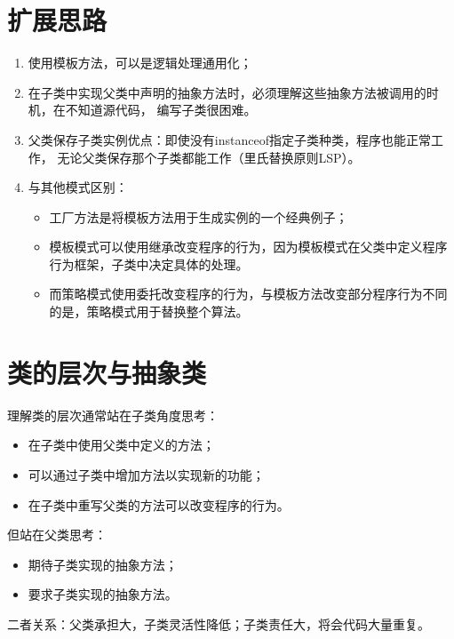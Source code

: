 \section{扩展思路}
\begin{enumerate}
	\item 使用模板方法，可以是逻辑处理通用化；
	\item 在子类中实现父类中声明的抽象方法时，必须理解这些抽象方法被调用的时机，在不知道源代码，
	编写子类很困难。
	\item 父类保存子类实例优点：即使没有instanceof指定子类种类，程序也能正常工作，
	无论父类保存那个子类都能工作（里氏替换原则LSP）。
	\item 与其他模式区别：
	\begin{itemize}
		\item 工厂方法是将模板方法用于生成实例的一个经典例子；
		\item 模板模式可以使用继承改变程序的行为，因为模板模式在父类中定义程序行为框架，子类中决定具体的处理。
		\item 而策略模式使用委托改变程序的行为，与模板方法改变部分程序行为不同的是，策略模式用于替换整个算法。
	\end{itemize}
\end{enumerate}
\section{类的层次与抽象类}
理解类的层次通常站在子类角度思考：
\begin{itemize}
	\item 在子类中使用父类中定义的方法；
	\item 可以通过子类中增加方法以实现新的功能；
	\item 在子类中重写父类的方法可以改变程序的行为。
\end{itemize}
但站在父类思考：
\begin{itemize}
	\item 期待子类实现的抽象方法；
	\item 要求子类实现的抽象方法。
\end{itemize}
二者关系：父类承担大，子类灵活性降低；子类责任大，将会代码大量重复。